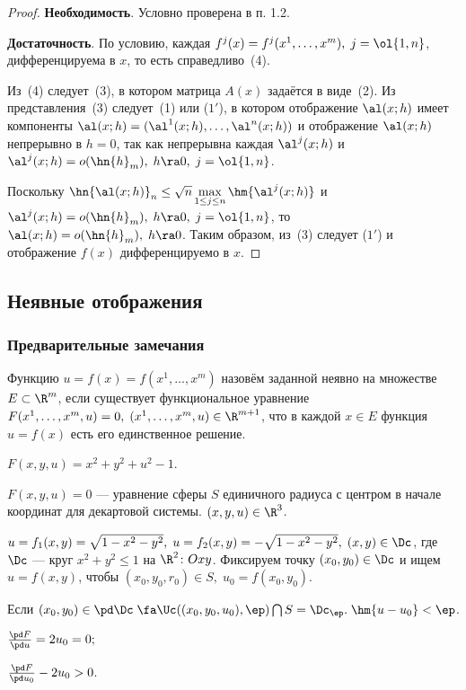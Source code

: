 \documentclass[a4paper]{article}
\begin{document}
\begin{proof}
\textbf{Необходимость}. Условно проверена в п. 1.2.

\textbf{Достаточность}. По условию, каждая $f^j(x) =
f^j(x^1,\ldots,x^m), \; j=\ol{1,n}$, дифференцируема в $x$, то есть
справедливо~(4).

Из~(4) следует~(3), в котором матрица $A(x)$ задаётся в виде~(2). Из
представления~(3) следует~(1) или ($1'$), в котором отображение
$\al(x;h)$ имеет компоненты $\al(x;h) = (\al^1(x;h), \ldots,
\al^n(x;h))$ и отображение $\al(x;h)$ непрерывно в $h=0$, так как
непрерывна каждая $\al^j(x;h)$ и $\al^j(x;h) = o(\hn{h}_m), \;
h\ra0, \; j=\ol{1,n}$.

Поскольку $\hn{\al(x;h)}_n \le \sqrt{n} \max\limits_{1\le j \le n}
\hm{\al^j(x;h)}$ и $\al^j(x;h) = o(\hn{h}_m), \; h\ra0, \;
j=\ol{1,n}$, то $\al(x;h) = o(\hn{h}_m), \; h\ra0$. Таким образом,
из~(3) следует ($1'$) и отображение $f(x)$ дифференцируемо в $x$.
\end{proof}

\subsection{Неявные отображения}

\subsubsection{ Предварительные замечания}

Функцию $u=f(x)=f(x^1,\ldots,x^m)$ назовём заданной неявно на
множестве $E\subset \R^m$, если существует функциональное уравнение
$F(x^1,\ldots,x^m,u) = 0, \; (x^1,\ldots,x^m,u) \in \R^{m+1}$, что в
каждой $x\in E$ функция $u=f(x)$ есть его единственное решение.

$F(x,y,u) = x^2+y^2+u^2-1$.

$F(x,y,u)=0$ --- уравнение сферы $S$ единичного радиуса с центром в
начале координат для декартовой системы. $(x,y,u)\in \R^3$.

$u=f_1(x,y) = \sqrt{1-x^2-y^2}, \; u=f_2(x,y) = - \sqrt{1-x^2-y^2},
\; (x,y)\in \Dc$, где $\Dc$ --- круг $x^2+y^2 \le 1$ на $\R^2\colon
Oxy$. Фиксируем точку $(x_0,y_0)\in \Dc$ и ищем $u=f(x,y)$, чтобы
$(x_0,y_0,r_0)\in S, \; u_0 = f(x_0,y_0)$.

Если $(x_0,y_0)\in \pd \Dc \; \fa
\Uc((x_0,y_0,u_0),\ep)\bigcap S = \Dc_{\ep}. \; \hm{u-u_0}<\ep$.

$\frac{\pd F}{\pd u} = 2u_0=0;$

$\frac{\pd F}{\pd u_0} - 2u_0>0$.
\end{document}
